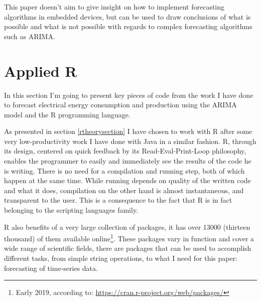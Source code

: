 \documentclass[12pt,a4paper,titlepage]{report}
\begin{document}
This paper doesn't aim to give insight on how to implement forecasting algorithms in embedded devices, but can be used to draw conclusions of what is possible and what is not possible with regards to complex forecasting algorithms such as ARIMA.

\section{Applied R}

In this section I'm going to present key pieces of code from the work I have done to forecast electrical energy consumption and production using the ARIMA model and the R programming language.

As presented in section \ref{rtheorysection} I have chosen to work with R after some very low-productivity work I have done with Java in a similar fashion. R, through its design, centered on quick feedback by its Read-Eval-Print-Loop philosophy, enables the programmer to easily and immediately see the results of the code he is writing. There is no need for a compilation and running step, both of which happen at the same time. While running depends on quality of the written code and what it does, compilation on the other hand is almost instantaneous, and transparent to the user.
This is a consequence to the fact that R is in fact belonging to the scripting languages family. 

R also benefits of a very large collection of packages, it has over 13000 (thirteen thousand) of them available online\footnote{Early 2019, according to: \url{https://cran.r-project.org/web/packages/}}. These packages vary in function and cover a wide range of scientific fields, there are packages that can be used to accomplish different tasks, from simple string operations, to what I need for this paper: forecasting of time-series data.
\end{document}
